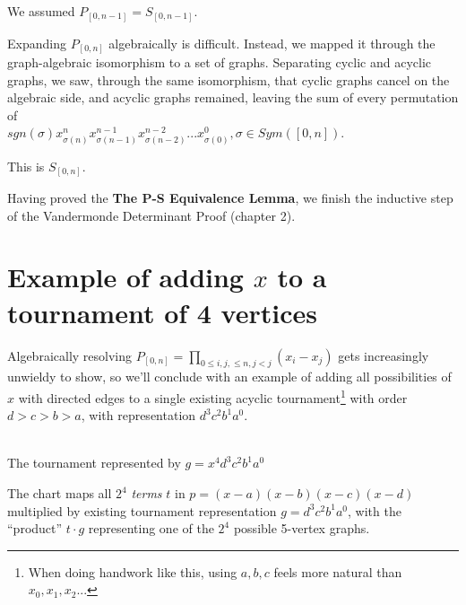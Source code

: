 \documentclass[11pt, oneside]{article} 	%
\begin{document}
We assumed $P_{[0, n-1]} = S_{[0, n-1]}$.

Expanding $P_{[0,n]}$ algebraically is difficult.  Instead, we mapped it through the graph-algebraic isomorphism to a set of graphs.  Separating cyclic and acyclic graphs, we saw, through the same isomorphism, that cyclic graphs cancel on the algebraic side, and acyclic graphs remained, leaving the sum of every permutation of  
\\
$sgn(\sigma) x_{\sigma(n)}^{n} x_{\sigma(n-1)}^{n-1} x_{\sigma(n-2)}^{n-2} ... x_{\sigma(0)}^{0}, \sigma \in Sym([0,n])$.

This is $S_{[0,n]}$.

Having proved the \textbf{The P-S Equivalence Lemma}, we finish the inductive step of the Vandermonde Determinant Proof (chapter 2).

\section{Example of adding $x$ to a tournament of 4 vertices} 

Algebraically resolving $P_{[0,n]} = \prod_{0 \leq i, j, \leq n, j < j} (x_i - x_j)$ gets increasingly unwieldy to show, so we'll conclude with an example of adding all possibilities of $x$ with directed edges to a single existing acyclic tournament\footnote{When doing handwork like this, using $a,b,c$ feels more natural than $x_0, x_1, x_2...$}  with order $d > c > b > a$, with representation $d^3c^2b^1a^0$.
\\

\\

The tournament represented by $g=x^4d^3c^2b^1a^0$

The chart maps all $2^4$ \emph{terms} $t$ in $p=(x-a)(x-b)(x-c)(x-d)$ multiplied by existing tournament representation $g=d^3c^2b^1a^0$, with the ``product'' $t \cdot g$ representing one of the $2^4$ possible 5-vertex graphs.
\end{document}
